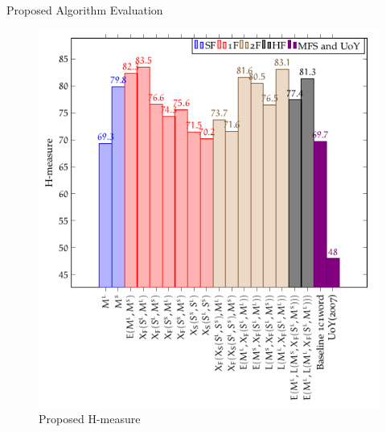 \documentclass[10pt,=table]{beamer}
\begin{document}
\begin{frame}{Proposed Algorithm Evaluation}
\begin{figure}
	\centering
	\includegraphics[width=.5\linewidth]{image2/Chapitre4/wsd_PA_Hm.png}
	\caption{Proposed H-measure}
\end{figure}
\end{frame}





%
%
%
%





%
%
\end{document}
